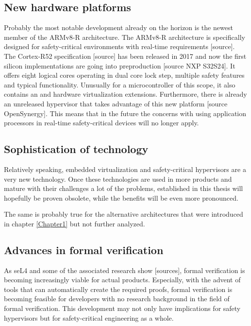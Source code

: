 \subsection{New hardware platforms}
Probably the most notable development already on the horizon is the newest member of the ARMv8-R architecture. The ARMv8-R architecture is specifically designed for safety-critical environments with real-time requirements [source]. %
The Cortex-R52 specification [source] has been released in 2017 and now the first silicon implementations are going into preproduction [source NXP S32S24]. It offers eight logical cores operating in dual core lock step, multiple safety features and typical  functionality. Unusually for a microcontroller of this scope, it also contains an  and hardware virtualization extensions. Furthermore, there is already an unreleased hypervisor that takes advantage of this new platform [source OpenSynergy]. This means that in the future the concerns with using application processors in real-time safety-critical devices will no longer apply.

\subsection{Sophistication of technology}
Relatively speaking, embedded virtualization and safety-critical hypervisors are a very new technology. Once these technologies are used in more products and mature with their challenges a lot of the problems, established in this thesis will hopefully be proven obsolete, while the benefits will be even more pronounced. 

The same is probably true for the alternative architectures that were introduced in chapter \ref{Chapter1} but not further analyzed.
\subsection{Advances in formal verification}
As seL4 and some of the associated research show [sources], formal verification is becoming increasingly viable for actual products. Especially, with the advent of tools that can automatically create the required proofs, formal verification is becoming feasible for developers with no research background in the field of formal verification. This development may not only have implications for safety hypervisors but for safety-critical engineering as a whole.

